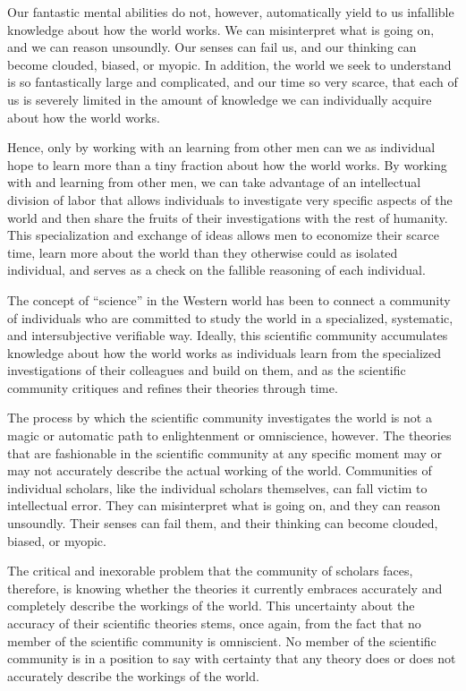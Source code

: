 Our fantastic mental abilities do not, however, automatically yield to us infallible knowledge about how the world works. We can misinterpret what is going on, and we can reason unsoundly. Our senses can fail us, and our thinking can become clouded, biased, or myopic. In addition, the world we seek to understand is so fantastically large and complicated, and our time so very scarce, that each of us is severely limited in the amount of knowledge we can individually acquire about how the world works.

Hence, only by working with an learning from other men can we as individual hope to learn more than a tiny fraction about how the world works. By working with and learning from other men, we can take advantage of an intellectual division of labor that allows individuals to investigate very specific aspects of the world and then share the fruits of their investigations with the rest of humanity. This specialization and exchange of ideas allows men to economize their scarce time, learn more about the world than they otherwise could as isolated individual, and serves as a check on the fallible reasoning of each individual.

The concept of ``science'' in the Western world has been to connect a community of individuals who are committed to study the world in a specialized, systematic, and intersubjective verifiable way. Ideally, this scientific community accumulates knowledge about how the world works as individuals learn from the specialized investigations of their colleagues and build on them, and as the scientific community critiques and refines their theories through time.

The process by which the scientific community investigates the world is not a magic or automatic path to enlightenment or omniscience, however. The theories that are fashionable in the scientific community at any specific moment may or may not accurately describe the actual working of the world. Communities of individual scholars, like the individual scholars themselves, can fall victim to intellectual error. They can misinterpret what is going on, and they can reason unsoundly. Their senses can fail them, and their thinking can become clouded, biased, or myopic.

The critical and inexorable problem that the community of scholars faces, therefore, is knowing whether the theories it currently embraces accurately and completely describe the workings of the world. This uncertainty about the accuracy of their scientific theories stems, once again, from the fact that no member of the scientific community is omniscient. No member of the scientific community is in a position to say with certainty that any theory does or does not accurately describe the workings of the world.

